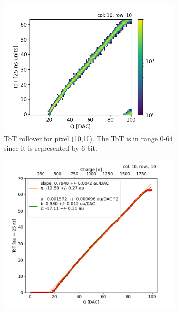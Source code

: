         \begin{figure}[h!]
            \begin{subfigure}{.5\textwidth}
            \centering
            \includegraphics[width=.98\linewidth]{figures/charaterization/ToT_rollover.png}
            \caption{ToT rollover for pixel (10,10). The ToT is in range 0-64 since it is represented by 6 bit.}
            \label{fig:}
            \end{subfigure}
            \begin{subfigure}{.5\textwidth}
            \centering
            \includegraphics[width=.98\linewidth]{figures/charaterization/ToT_injection.png}
            \caption{}
            \label{fig:}
            \end{subfigure}
        \end{figure}    

